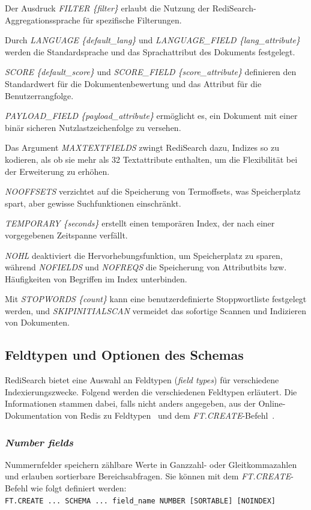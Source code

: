 Der Ausdruck \emph{FILTER \{filter\}} erlaubt die Nutzung der RediSearch-Aggregationssprache für spezifische Filterungen.

Durch \emph{LANGUAGE \{default\_lang\}} und \emph{LANGUAGE\_FIELD \{lang\_attribute\}} werden die Standardsprache und das Sprachattribut des Dokuments festgelegt.

\emph{SCORE \{default\_score\}} und \emph{SCORE\_FIELD \{score\_attribute\}} definieren den Standardwert für die Dokumentenbewertung und das Attribut für die Benutzerrangfolge.

\emph{PAYLOAD\_FIELD \{payload\_attribute\}} ermöglicht es, ein Dokument mit einer binär sicheren Nutzlastzeichenfolge zu versehen.

Das Argument \emph{MAXTEXTFIELDS} zwingt RediSearch dazu, Indizes so zu kodieren, als ob sie mehr als 32 Textattribute enthalten, um die Flexibilität bei der Erweiterung zu erhöhen.

\emph{NOOFFSETS} verzichtet auf die Speicherung von Termoffsets, was Speicherplatz spart, aber gewisse Suchfunktionen einschränkt.

\emph{TEMPORARY \{seconds\}} erstellt einen temporären Index, der nach einer vorgegebenen Zeitspanne verfällt.

\emph{NOHL} deaktiviert die Hervorhebungsfunktion, um Speicherplatz zu sparen, während \emph{NOFIELDS} und \emph{NOFREQS} die Speicherung von Attributbits bzw. Häufigkeiten von Begriffen im Index unterbinden.

Mit \emph{STOPWORDS \{count\}} kann eine benutzerdefinierte Stoppwortliste festgelegt werden, und \emph{SKIPINITIALSCAN} vermeidet das sofortige Scannen und Indizieren von Dokumenten.




\subsection{Feldtypen und Optionen des Schemas}\label{sec:redisearch-schema-fieldtypes}
RediSearch bietet eine Auswahl an Feldtypen (\emph{field types}) für verschiedene Indexierungszwecke. Folgend werden die verschiedenen Feldtypen erläutert. Die Informationen stammen dabei, falls nicht anders angegeben, aus der Online-Dokumentation von Redis zu Feldtypen~\cite{redis_ltd_field_nodate} und dem \emph{FT.CREATE}-Befehl~\cite{redis_ltd_ftcreate_nodate}.

\subsubsection{\emph{Number fields}}
Nummernfelder speichern zählbare Werte in Ganzzahl- oder Gleitkommazahlen und erlauben sortierbare Bereichsabfragen. Sie können mit dem \emph{FT.CREATE}-Befehl wie folgt definiert werden:\\
\texttt{FT.CREATE ... SCHEMA ... {field\_name} NUMBER [SORTABLE] [NOINDEX]}

